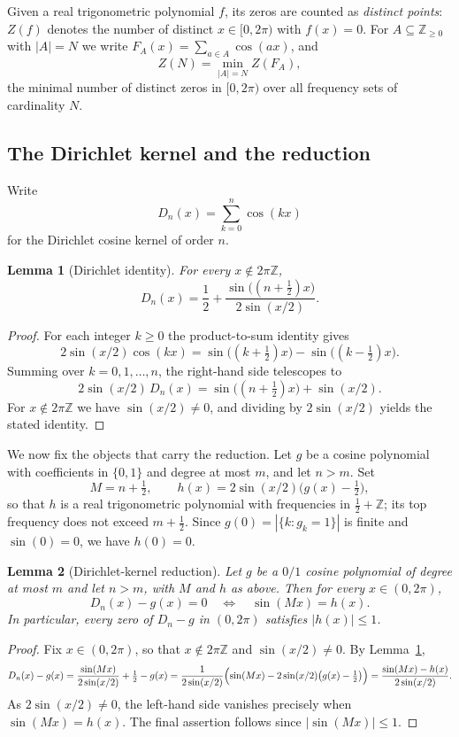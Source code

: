 \documentclass[11pt,reqno]{amsart}
\theoremstyle{plain}
\newtheorem{lemma}{Lemma}
\theoremstyle{definition}
\theoremstyle{remark}
\begin{document}
Given a real trigonometric polynomial $f$, its zeros are counted as \emph{distinct points}: $Z(f)$ denotes the number of distinct $x\in[0,2\pi)$ with $f(x)=0$. For $A\subseteq\mathbb{Z}_{\ge 0}$ with $|A|=N$ we write $F_A(x)=\sum_{a\in A}\cos(ax)$, and
\[
Z(N)=\min_{|A|=N} Z(F_A),
\]
the minimal number of distinct zeros in $[0,2\pi)$ over all frequency sets of cardinality $N$.

\subsection*{The Dirichlet kernel and the reduction}

Write
\[
D_n(x)=\sum_{k=0}^{n}\cos(kx)
\]
for the Dirichlet cosine kernel of order $n$.

\begin{lemma}[Dirichlet identity]\label{lem:dirichlet}
For every $x\notin 2\pi\mathbb{Z}$,
\[
D_n(x)=\frac{1}{2}+\frac{\sin\bigl((n+\tfrac12)x\bigr)}{2\sin(x/2)}.
\]
\end{lemma}

\begin{proof}
For each integer $k\ge 0$ the product-to-sum identity gives
\[
2\sin(x/2)\cos(kx)=\sin\bigl((k+\tfrac12)x\bigr)-\sin\bigl((k-\tfrac12)x\bigr).
\]
Summing over $k=0,1,\dots,n$, the right-hand side telescopes to
\[
2\sin(x/2)\,D_n(x)=\sin\bigl((n+\tfrac12)x\bigr)+\sin(x/2).
\]
For $x\notin 2\pi\mathbb{Z}$ we have $\sin(x/2)\neq 0$, and dividing by $2\sin(x/2)$ yields the stated identity.
\end{proof}

We now fix the objects that carry the reduction. Let $g$ be a cosine polynomial with coefficients in $\{0,1\}$ and degree at most $m$, and let $n>m$. Set
\[
M=n+\tfrac12,\qquad h(x)=2\sin(x/2)\bigl(g(x)-\tfrac12\bigr),
\]
so that $h$ is a real trigonometric polynomial with frequencies in $\tfrac12+\mathbb{Z}$; its top frequency does not exceed $m+\tfrac12$. Since $g(0)=|\{k:g_k=1\}|$ is finite and $\sin(0)=0$, we have $h(0)=0$.

\begin{lemma}[Dirichlet-kernel reduction]\label{lem:reduction}
Let $g$ be a $0/1$ cosine polynomial of degree at most $m$ and let $n>m$, with $M$ and $h$ as above. Then for every $x\in(0,2\pi)$,
\[
D_n(x)-g(x)=0\quad\Longleftrightarrow\quad \sin(Mx)=h(x).
\]
In particular, every zero of $D_n-g$ in $(0,2\pi)$ satisfies $|h(x)|\le 1$.
\end{lemma}

\begin{proof}
Fix $x\in(0,2\pi)$, so that $x\notin 2\pi\mathbb{Z}$ and $\sin(x/2)\neq 0$. By Lemma~\ref{lem:dirichlet},
\[
D_n(x)-g(x)=\frac{\sin(Mx)}{2\sin(x/2)}+\tfrac12-g(x)
=\frac{1}{2\sin(x/2)}\Bigl(\sin(Mx)-2\sin(x/2)\bigl(g(x)-\tfrac12\bigr)\Bigr)
=\frac{\sin(Mx)-h(x)}{2\sin(x/2)}.
\]
As $2\sin(x/2)\neq 0$, the left-hand side vanishes precisely when $\sin(Mx)=h(x)$. The final assertion follows since $|\sin(Mx)|\le 1$.
\end{proof}
\end{document}
